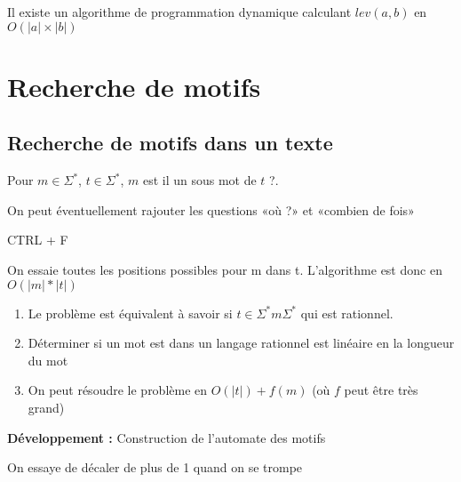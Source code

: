 \begin{corollary}
	Il existe un algorithme de programmation dynamique calculant $lev(a, b)$ en $O(|a| \times |b|)$
\end{corollary}

\section{Recherche de motifs}

\subsection{Recherche de motifs dans un texte}

\begin{definition}
	Pour $m\in \Sigma^*$, $t\in \Sigma^*$, $m$ est il un sous mot de $t$ ?.
\end{definition}

\begin{rem}
	On peut éventuellement rajouter les questions «où ?» et «combien de fois»
\end{rem}

\begin{appl}
	CTRL + F
\end{appl}


\begin{algo}
	On essaie toutes les positions possibles pour m dans t. L'algorithme est donc en $O(|m|*|t|)$
\end{algo}

\begin{proposition} \enspace
	\begin{enumerate}
		\item Le problème est équivalent à savoir si $t \in \Sigma^* m \Sigma^*$ qui est rationnel.
		\item Déterminer si un mot est dans un langage rationnel est linéaire en la longueur du mot
		\item On peut résoudre le problème en $O(|t|) + f(m)$ (où $f$ peut être très grand)
	\end{enumerate}
\end{proposition}

\textbf{Développement :} Construction de l'automate des motifs

\begin{idee}
	On essaye de décaler de plus de 1 quand on se trompe
\end{idee}

